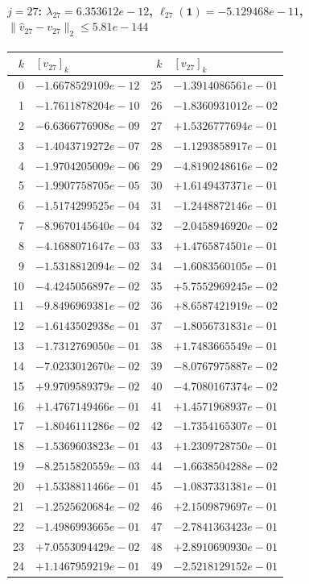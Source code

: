 \documentclass[11pt]{article}
\begin{document}
\paragraph{$j = 27$: $\lambda_{27} = 6.353612e-12$, \quad $\ell_{27}(\mathbf{1}) = -5.129468e-11$, \quad $\|\hat{v}_{27} - v_{27}\|_2 \leq 5.81e-144$}
\begin{center}
{\footnotesize
\begin{tabular}{r@{\;\;}l@{\quad}r@{\;\;}l}
\toprule
$k$ & $[v_{27}]_k$ & $k$ & $[v_{27}]_k$ \\
\midrule
0 & $-1.6678529109e-12$ & 25 & $-1.3914086561e-01$ \\
1 & $-1.7611878204e-10$ & 26 & $-1.8360931012e-02$ \\
2 & $-6.6366776908e-09$ & 27 & $+1.5326777694e-01$ \\
3 & $-1.4043719272e-07$ & 28 & $-1.1293858917e-01$ \\
4 & $-1.9704205009e-06$ & 29 & $-4.8190248616e-02$ \\
5 & $-1.9907758705e-05$ & 30 & $+1.6149437371e-01$ \\
6 & $-1.5174299525e-04$ & 31 & $-1.2448872146e-01$ \\
7 & $-8.9670145640e-04$ & 32 & $-2.0458946920e-02$ \\
8 & $-4.1688071647e-03$ & 33 & $+1.4765874501e-01$ \\
9 & $-1.5318812094e-02$ & 34 & $-1.6083560105e-01$ \\
10 & $-4.4245056897e-02$ & 35 & $+5.7552969245e-02$ \\
11 & $-9.8496969381e-02$ & 36 & $+8.6587421919e-02$ \\
12 & $-1.6143502938e-01$ & 37 & $-1.8056731831e-01$ \\
13 & $-1.7312769050e-01$ & 38 & $+1.7483665549e-01$ \\
14 & $-7.0233012670e-02$ & 39 & $-8.0767975887e-02$ \\
15 & $+9.9709589379e-02$ & 40 & $-4.7080167374e-02$ \\
16 & $+1.4767149466e-01$ & 41 & $+1.4571968937e-01$ \\
17 & $-1.8046111286e-02$ & 42 & $-1.7354165307e-01$ \\
18 & $-1.5369603823e-01$ & 43 & $+1.2309728750e-01$ \\
19 & $-8.2515820559e-03$ & 44 & $-1.6638504288e-02$ \\
20 & $+1.5338811466e-01$ & 45 & $-1.0837331381e-01$ \\
21 & $-1.2525620684e-02$ & 46 & $+2.1509879697e-01$ \\
22 & $-1.4986993665e-01$ & 47 & $-2.7841363423e-01$ \\
23 & $+7.0553094429e-02$ & 48 & $+2.8910690930e-01$ \\
24 & $+1.1467959219e-01$ & 49 & $-2.5218129152e-01$ \\
\bottomrule
\end{tabular}
}
\end{center}
\end{document}
